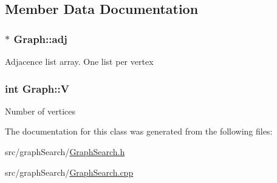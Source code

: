 \subsection{Member Data Documentation}
\hypertarget{classGraph_a45d7812cbbb4c9b9e59bffb5b52eaee1}{
\subsubsection[{adj}]{$\ast$ Graph\-::adj}}\label{classGraph_a45d7812cbbb4c9b9e59bffb5b52eaee1}
Adjacence list array. One list per vertex \hypertarget{classGraph_a2b722f7cfa7a21e4cb5fae488b3d4dcc}{
\subsubsection[{V}]{\setlength{\rightskip}{0pt plus 5cm}int Graph\-::\-V}}\label{classGraph_a2b722f7cfa7a21e4cb5fae488b3d4dcc}
Number of vertices 

The documentation for this class was generated from the following files\-:\begin{DoxyCompactItemize}
\item 
src/graph\-Search/\hyperlink{GraphSearch_8h}{Graph\-Search.\-h}\item 
src/graph\-Search/\hyperlink{GraphSearch_8cpp}{Graph\-Search.\-cpp}\end{DoxyCompactItemize}
